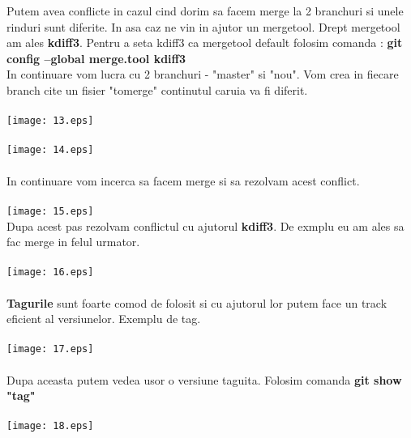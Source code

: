 \tab Putem avea conflicte in cazul cind dorim sa facem merge la 2 branchuri si unele
rinduri sunt diferite. In asa caz ne vin in ajutor un mergetool. Drept mergetool am ales
\textbf{kdiff3}. Pentru a seta kdiff3 ca mergetool default folosim comanda : 
\textbf{git config --global merge.tool kdiff3}
~\\
\tab In continuare vom lucra cu 2 branchuri - "master" si "nou". Vom crea in fiecare
branch cite un fisier "tomerge" continutul caruia va fi diferit.\\
~\\
\texttt{[image: 13.eps]}\\
~\\
\texttt{[image: 14.eps]}\\
~\\
In continuare vom incerca sa facem merge si sa rezolvam acest conflict.\\
~\\
\texttt{[image: 15.eps]}\\
\clearpage
Dupa acest pas rezolvam conflictul cu ajutorul \textbf{kdiff3}. De exmplu eu 
am ales sa fac merge in felul urmator.\\
~\\
\texttt{[image: 16.eps]}\\
~\\
\textbf{Tagurile} sunt foarte comod de folosit si cu ajutorul lor putem face un track
eficient al versiunelor. Exemplu de tag.\\
\\
\texttt{[image: 17.eps]}\\
~\\
Dupa aceasta putem vedea usor o versiune taguita. Folosim comanda
\textbf{git show "tag"}\\
~\\
\texttt{[image: 18.eps]}\\
\clearpage
